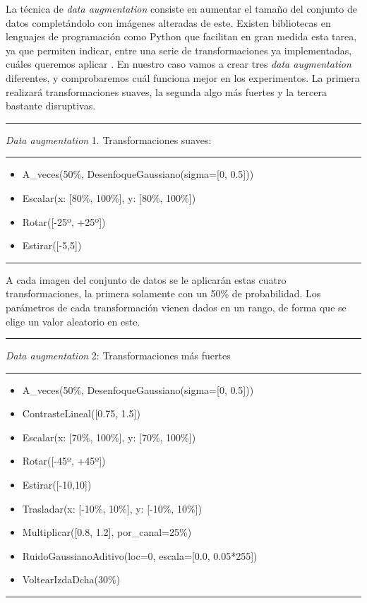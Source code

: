La técnica de \textit{data augmentation} consiste en aumentar el tamaño del conjunto de datos completándolo con imágenes alteradas de este. Existen bibliotecas en lenguajes de programación como Python que facilitan en gran medida esta tarea, ya que permiten indicar, entre una serie de transformaciones ya implementadas, cuáles queremos aplicar \cite{imgaug}. En nuestro caso vamos a crear tres \textit{data augmentation} diferentes, y comprobaremos cuál funciona mejor en los experimentos. La primera realizará transformaciones suaves, la segunda algo más fuertes y la tercera bastante disruptivas.

\noindent\rule{\textwidth}{1pt}
\noindent\textit{Data augmentation} 1. Transformaciones suaves:
\vspace{-0.2cm}
\\\noindent\rule{\textwidth}{1pt}
\begin{itemize}
    \item A\_veces(50\%, DesenfoqueGaussiano(sigma=[0, 0.5]))
    \item Escalar(x: [80\%, 100\%], y: [80\%, 100\%])
    \item Rotar([-25º, +25º])
    \item Estirar([-5,5])
\end{itemize}
\vspace{-0.3cm}
\noindent\rule{\textwidth}{1pt}


A cada imagen del conjunto de datos se le aplicarán estas cuatro transformaciones, la primera solamente con un 50\% de probabilidad. Los parámetros de cada transformación vienen dados en un rango, de forma que se elige un valor aleatorio en este.

\noindent\rule{\textwidth}{1pt}
\noindent\textit{Data augmentation} 2: Transformaciones más fuertes
\vspace{-0.2cm}
\\\noindent\rule{\textwidth}{1pt}
\begin{itemize}
    \item A\_veces(50\%, DesenfoqueGaussiano(sigma=[0, 0.5]))
    \item ContrasteLineal([0.75, 1.5])
    \item Escalar(x: [70\%, 100\%], y: [70\%, 100\%])
    \item Rotar([-45º, +45º])
    \item Estirar([-10,10])
    \item Trasladar(x: [-10\%, 10\%], y: [-10\%, 10\%])
    \item Multiplicar([0.8, 1.2], por\_canal=25\%)
    \item RuidoGaussianoAditivo(loc=0, escala=[0.0, 0.05*255])
    \item VoltearIzdaDcha(30\%)
\end{itemize}
\vspace{-0.3cm}
\noindent\rule{\textwidth}{1pt}


